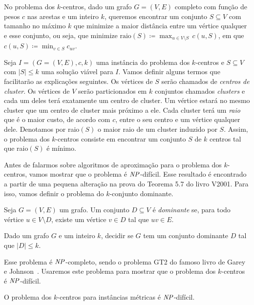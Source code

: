 No problema dos $k$-centros, dado um grafo $G = (V,E)$ completo com função de pesos $c$ nas arestas e um inteiro $k$, queremos encontrar um conjunto $S \subseteq V$ com tamanho no máximo $k$ que minimize a maior distância entre um vértice qualquer e esse conjunto, ou seja, que minimize $\text{raio}(S)\coloneqq \max_{u \in V\setminus S}\, c(u,S)$, em que $c(u,S) \coloneqq \min_{v \in S} c_{uv} $.


Seja $I = (G = (V,E),c,k)$ uma instância do problema dos $k$-centros e $S \subseteq V$ com $|S| \leq k$ uma solução viável para $I$. Vamos definir alguns termos que facilitarão as explicações seguintes. Os vértices de $S$ serão chamados de \emph{centros de cluster}. Os vértices de $V$ serão particionados em $k$ conjuntos chamados \emph{clusters} e cada um deles terá exatamente um centro de cluster. Um vértice estará no mesmo cluster que um centro de cluster mais próximo a ele. Cada cluster terá um \emph{raio} que é o maior custo, de acordo com $c$, entre o seu centro e um vértice qualquer dele. Denotamos por raio$(S)$ o maior raio de um cluster induzido por $S$. Assim, o problema dos $k$-centros consiste em encontrar um conjunto $S$ de $k$ centros tal que raio$(S)$ é mínimo.

Antes de falarmos sobre algoritmos de aproximação para o problema dos $k$-centros, vamos mostrar que o problema é $\mathit{NP}$-difícil. Esse resultado é encontrado a partir de uma pequena alteração na prova do Teorema 5.7 do livro V2001. Para isso, vamos definir o problema do $k$-conjunto dominante.

\begin{definition}
    Seja $G = (V,E)$ um grafo. Um conjunto $D \subseteq V$ é \emph{dominante} se, para todo vértice $u \in V \setminus D$, existe um vértice $v \in D$ tal que $uv \in E$.
\end{definition}

\begin{problem}
    Dado um grafo $G$ e um inteiro $k$, decidir se $G$ tem um conjunto dominante $D$ tal que $|D| \leq k$.      
\end{problem}
Esse problema é $\mathit{NP}$-completo, sendo o problema GT2 do famoso livro de Garey e Johnson~\cite{garey1979computers}. Usaremos este problema para mostrar que o problema dos $k$-centros é $\mathit{NP}$-difícil.

\begin{theorem}\label{theorem:2.3}
    O problema dos $k$-centros para instâncias métricas é $\mathit{NP}$-difícil.
\end{theorem}

